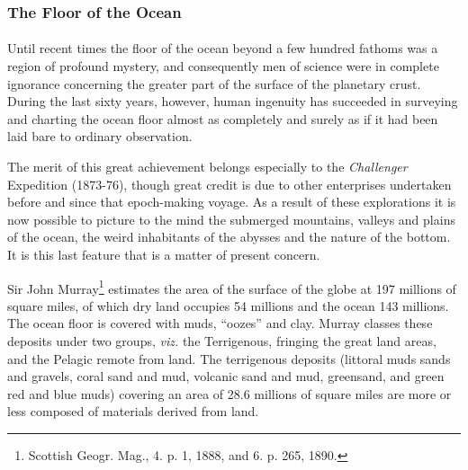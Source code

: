 \documentclass[a4paper, 12pt, oneside]{article}
\begin{document}
\subsubsection{The Floor of the Ocean}
\paragraph{}
Until recent times the floor of the ocean beyond a few hundred fathoms was a region of profound mystery, and consequently men of science were in complete ignorance concerning the greater part of the surface of the planetary crust. During the last sixty years, however, human ingenuity has succeeded in surveying and charting the ocean floor almost as completely and surely as if it had been laid bare to ordinary observation.

The merit of this great achievement belongs especially to the \emph{Challenger} Expedition (1873-76), though great credit is due to other enterprises undertaken before and since that epoch-making voyage. As a result of these explorations it is now possible to picture to the mind the submerged mountains, valleys and plains of the ocean, the weird inhabitants of the abysses and the nature of the bottom. It is this last feature that is a matter of present concern.

Sir John Murray\footnote{Scottish Geogr. Mag., 4. p. 1, 1888, and 6. p. 265, 1890. } estimates the area of the surface of the globe at 197 millions of square miles, of which dry land occupies 54 millions and the ocean 143 millions. The ocean floor is covered with muds, ``oozes'' and clay. Murray classes these deposits under two groups, \emph{viz.} the Terrigenous, fringing the great land areas, and the Pelagic remote from land. The terrigenous deposits (littoral muds sands and gravels, coral sand and mud, volcanic sand and mud, greensand, and green red and blue muds) covering an area of 28.6 millions of square miles are more or less composed of materials derived from land.
\end{document}
